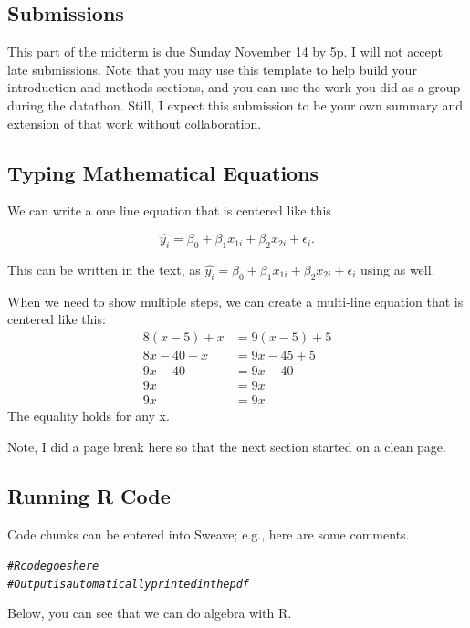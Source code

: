 \documentclass{article}\usepackage[]{graphicx}\usepackage[]{xcolor}
\makeatletter
\newcommand{\hlcom}[1]{\textcolor[rgb]{0.678,0.584,0.686}{\textit{#1}}}%
\newenvironment{kframe}{%
 \def\at@end@of@kframe{}%
 \ifinner\ifhmode%
  \def\at@end@of@kframe{\end{minipage}}%
  \begin{minipage}{\columnwidth}%
 \fi\fi%
 \def\FrameCommand##1{\hskip\@totalleftmargin \hskip-\fboxsep
 \colorbox{shadecolor}{##1}\hskip-\fboxsep
     \hskip-\linewidth \hskip-\@totalleftmargin \hskip\columnwidth}%
 \MakeFramed {\advance\hsize-\width
   \@totalleftmargin\z@ \linewidth\hsize
   \@setminipage}}%
 {\par\unskip\endMakeFramed%
 \at@end@of@kframe}
\newenvironment{knitrout}{}{} %
\makeatother
\begin{document}
\begin{multicols}{2}
\subsection{Submissions}
This part of the midterm is due Sunday November 14 by 5p. I will not accept late submissions. Note that you may use this template to help build your introduction and methods sections, and you can use the work you did as a group during the datathon. Still, I expect this submission to be your own summary and extension of that work without collaboration.

\subsection{Typing Mathematical Equations}
We can write a one line equation that is centered like this
\begin{center}
  \[\widehat{y_i} = \beta_0 + \beta_1 x_{1i}+ \beta_2 x_{2i} + \epsilon_i.\]
\end{center}
This can be written in the text, as $\widehat{y_i} = \beta_0 + \beta_1 x_{1i}+ \beta_2 x_{2i} + \epsilon_i$ using as well.
  
When we need to show multiple steps, we can create a multi-line equation that is centered like this: 
\begin{align*}
8(x-5)+x&=9(x-5)+5 \\
8x-40+x&=9x-45+5 \tag{Distributing}\\
9x-40&=9x-40 \tag{Combining like terms}\\
9x&=9x \tag{Adding 40 to both sides}\\
9x&=9x \tag{Dividing both sides by 9}
\end{align*}
The equality holds for any x.

Note, I did a page break here so that the next section
started on a clean page.
\newpage

\subsection{Running R Code}
Code chunks can be entered into Sweave; e.g., here are some comments.

\begin{knitrout}\scriptsize
{}\color{fgcolor}\begin{kframe}
\begin{alltt}
\hlcom{# R code goes here}
\hlcom{# Output is automatically printed in the pdf}
\end{alltt}
\end{kframe}
\end{knitrout}
Below, you can see that we can do algebra with R.


\end{multicols}
\end{document}
